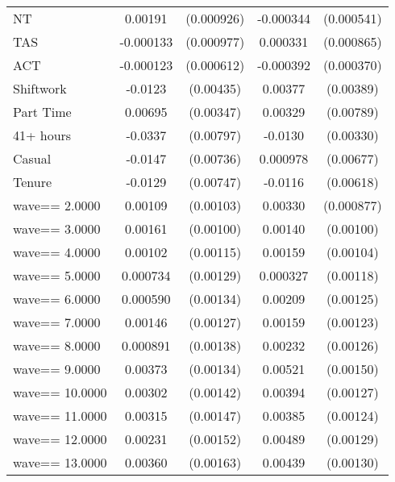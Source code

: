 {\begin{tabular}{l*{2}{cc}}
NT                  &     0.00191\sym{**} &  (0.000926)&   -0.000344         &  (0.000541)\\
TAS                 &   -0.000133         &  (0.000977)&    0.000331         &  (0.000865)\\
ACT                 &   -0.000123         &  (0.000612)&   -0.000392         &  (0.000370)\\
Shiftwork           &     -0.0123\sym{***}&   (0.00435)&     0.00377         &   (0.00389)\\
Part Time           &     0.00695\sym{**} &   (0.00347)&     0.00329         &   (0.00789)\\
41+ hours           &     -0.0337\sym{***}&   (0.00797)&     -0.0130\sym{***}&   (0.00330)\\
Casual              &     -0.0147\sym{**} &   (0.00736)&    0.000978         &   (0.00677)\\
Tenure              &     -0.0129\sym{*}  &   (0.00747)&     -0.0116\sym{*}  &   (0.00618)\\
wave==     2.0000   &     0.00109         &   (0.00103)&     0.00330\sym{***}&  (0.000877)\\
wave==     3.0000   &     0.00161         &   (0.00100)&     0.00140         &   (0.00100)\\
wave==     4.0000   &     0.00102         &   (0.00115)&     0.00159         &   (0.00104)\\
wave==     5.0000   &    0.000734         &   (0.00129)&    0.000327         &   (0.00118)\\
wave==     6.0000   &    0.000590         &   (0.00134)&     0.00209\sym{*}  &   (0.00125)\\
wave==     7.0000   &     0.00146         &   (0.00127)&     0.00159         &   (0.00123)\\
wave==     8.0000   &    0.000891         &   (0.00138)&     0.00232\sym{*}  &   (0.00126)\\
wave==     9.0000   &     0.00373\sym{***}&   (0.00134)&     0.00521\sym{***}&   (0.00150)\\
wave==    10.0000   &     0.00302\sym{**} &   (0.00142)&     0.00394\sym{***}&   (0.00127)\\
wave==    11.0000   &     0.00315\sym{**} &   (0.00147)&     0.00385\sym{***}&   (0.00124)\\
wave==    12.0000   &     0.00231         &   (0.00152)&     0.00489\sym{***}&   (0.00129)\\
wave==    13.0000   &     0.00360\sym{**} &   (0.00163)&     0.00439\sym{***}&   (0.00130)\\

\end{tabular}}
